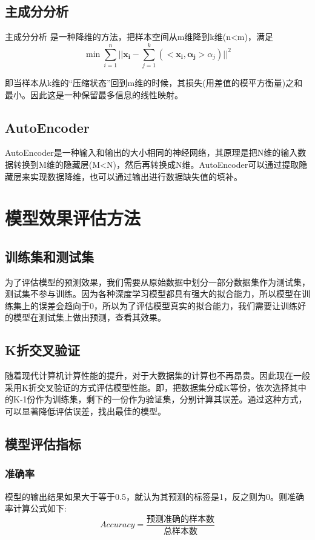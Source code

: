 \subsection{主成分分析}
主成分分析\cite{shlens2014pca} 是一种降维的方法，把样本空间从m维降到k维(n<m)，满足
\[
\min \sum_{i = 1}^{n} ||\bm{x_i} - \sum_{j=1}^{k}(<\bm{x_i},\bm{\alpha_j}>\alpha_j)||^2
\]

即当样本从k维的“压缩状态”回到m维的时候，其损失(用差值的模平方衡量)之和最小。因此这是一种保留最多信息的线性映射。
\subsection{AutoEncoder}
AutoEncoder是一种输入和输出的大小相同的神经网络，其原理是把N维的输入数据转换到M维的隐藏层(M<N)，然后再转换成N维。AutoEncoder可以通过提取隐藏层来实现数据降维，也可以通过输出进行数据缺失值的填补。\cite{vincent2008autoencoder}

\section{模型效果评估方法}
\subsection{训练集和测试集}
为了评估模型的预测效果，我们需要从原始数据中划分一部分数据集作为测试集，测试集不参与训练。因为各种深度学习模型都具有强大的拟合能力，所以模型在训练集上的误差会趋向于0，所以为了评估模型真实的拟合能力，我们需要让训练好的模型在测试集上做出预测，查看其效果。
\subsection{K折交叉验证}
随着现代计算机计算性能的提升，对于大数据集的计算也不再昂贵。因此现在一般采用K折交叉验证的方式评估模型性能。即，把数据集分成K等份，依次选择其中的K-1份作为训练集，剩下的一份作为验证集，分别计算其误差。通过这种方式，可以显著降低评估误差，找出最佳的模型。\cite[213]{james2013introduction}
\subsection{模型评估指标}
\subsubsection{准确率}
模型的输出结果如果大于等于0.5，就认为其预测的标签是1，反之则为0。则准确率计算公式如下: 
\[
Accuracy = \dfrac{\text{预测准确的样本数}}{\text{总样本数}}
\]
